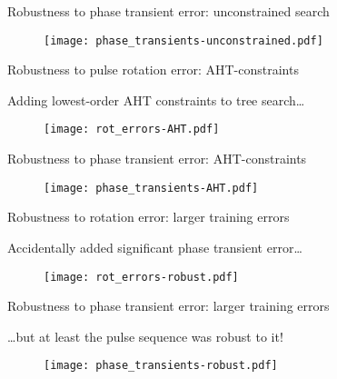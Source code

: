 \documentclass{beamer}
\begin{document}
\begin{frame}{Robustness to phase transient error: unconstrained search}

\begin{figure}
\centering
\texttt{[image: phase\_transients-unconstrained.pdf]}
\end{figure}

\end{frame}


\begin{frame}
{Robustness to pulse rotation error: AHT-constraints}

Adding lowest-order AHT constraints to tree search\dots

\begin{figure}
\centering
\texttt{[image: rot\_errors-AHT.pdf]}
\end{figure}

\end{frame}


\begin{frame}
{Robustness to phase transient error: AHT-constraints}

\begin{figure}
\centering
\texttt{[image: phase\_transients-AHT.pdf]}
\end{figure}

\end{frame}

\begin{frame}
{Robustness to rotation error: larger training errors}


Accidentally added significant phase transient error\dots

\begin{figure}
\centering
\texttt{[image: rot\_errors-robust.pdf]}
\end{figure}

\end{frame}

\begin{frame}
{Robustness to phase transient error: larger training errors}


\dots but at least the pulse sequence was robust to it!

\begin{figure}
\centering
\texttt{[image: phase\_transients-robust.pdf]}
\end{figure}

\end{frame}
\end{document}
